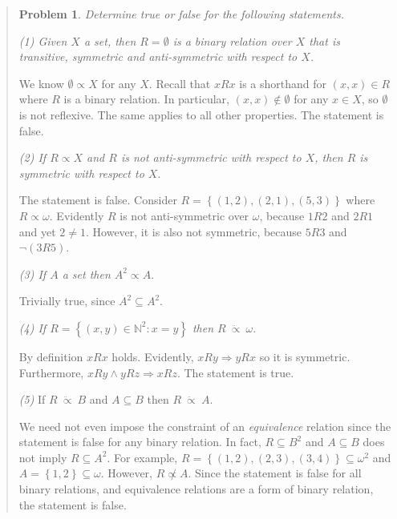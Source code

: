 \documentclass[a4paper, 12pt]{article}
\newtheorem{problem}{Problem}
\newtheorem{problem}{Problem}
\begin{document}
\small
\begin{quote}

\begin{problem}
    Determine true or false for the following statements.
\end{problem}

\textit{(1) Given $X$ a set, then $R = \emptyset$ is a binary relation over $X$
that is transitive, symmetric and anti-symmetric with respect to $X$.}

We know $\emptyset \propto X$ for any $X$. Recall that $xRx$ is a shorthand for
$(x, x) \in R$ where $R$ is a binary relation. In particular, $(x, x) \not\in
\emptyset$ for any $x \in X$, so $\emptyset$ is not reflexive. The same applies
to all other properties. The statement is false.

\textit{(2) If $R \propto X$ and $R$ is not anti-symmetric with respect to $X$,
then $R$ is symmetric with respect to $X$}.

The statement is false. Consider $R = \left\{ (1, 2), (2, 1), (5, 3) \right\} $ where $R \propto
\omega$. Evidently $R$ is not anti-symmetric over $\omega$, because $1R2$ and
$2R 1$ and yet $2 \neq 1$. However, it is also not symmetric, because $5R 3$ and
$\neg (3 R 5)$.

\textit{(3) If $A$ a set then $A^2 \propto A$}. 

Trivially true, since $A^2 \subseteq A^2$.

\textit{(4) If $R = \left\{ (x, y) \in \mathbb{N}^2 : x = y \right\} $ then $R
~\ddot{\propto }~ \omega$}.

By definition $xRx$ holds. Evidently, $xRy \Rightarrow yRx$ so it is symmetric.
Furthermore, $xRy \land yRz \Rightarrow xRz$. The statement is true.

\textit{(5)} If $R ~ \ddot{\propto} ~ B$ and $A \subseteq B$ then $R ~
\ddot{\propto} ~A$.

We need not even impose the constraint of an \textit{equivalence} relation since
the statement is false for any binary relation. In fact, $R \subseteq B^2$ and
$A \subseteq B$ does not imply $R \subseteq A^2$. For example, $R = \left\{ (1,
2), (2, 3), (3, 4) \right\} \subseteq \omega^2 $ and $A = \left\{ 1, 2 \right\}
 \subseteq \omega$. However, $R \not\propto A$. Since the statement is false for
 all binary relations, and equivalence relations are a form of binary relation,
 the statement is false.

\end{quote}
\normalsize
\end{document}
